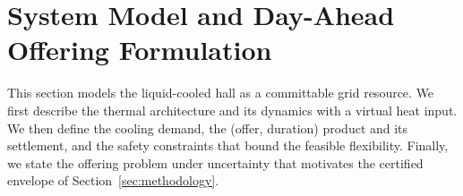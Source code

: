 \section{System Model and Day-Ahead Offering Formulation}
\label{sec:problem_formulation}
This section models the liquid-cooled hall as a committable grid resource. We
first describe the thermal architecture and its dynamics with a virtual heat
input. We then define the cooling demand, the (offer, duration) product and
its settlement, and the safety constraints that bound the feasible
flexibility. Finally, we state the offering problem under uncertainty that
motivates the certified envelope of Section~\ref{sec:methodology}.

